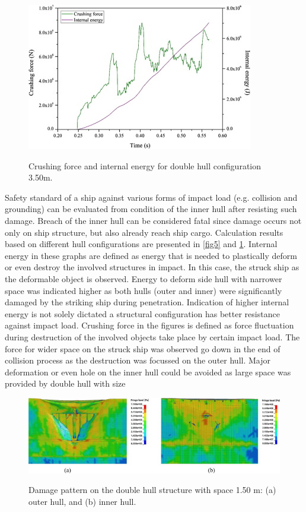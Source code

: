 \documentclass[../Final.tex]{subfiles}
\begin{document}
\begin{figure}[h]
    \centering
    \includegraphics[width=\columnwidth]{fig6.jpg}
    \label{fig6}
    \caption{Crushing force and internal energy for double hull configuration 3.50m.}
\end{figure}

Safety standard of a ship against various forms of impact load (e.g. collision and grounding) can be evaluated from condition of the inner hull after resisting such damage. 
Breach of the inner hull can be considered fatal since damage occurs not only on ship structure, but also already reach ship cargo. Calculation results based on different hull configurations are presented in \ref{fig5} and \ref{fig6}. 
Internal energy in these graphs are defined as energy that is needed to plastically deform or even destroy the involved structures in impact. 
In this case, the struck ship as the deformable object is observed. Energy to deform side hull with narrower space was indicated higher as both hulls (outer and inner) were significantly damaged by the striking ship during penetration. 
Indication of higher internal energy is not solely dictated a structural configuration has better resistance against impact load. 
Crushing force in the figures is defined as force fluctuation during destruction of the involved objects take place by certain impact load. 
The force for wider space on the struck ship was observed go down in the end of collision process as the destruction was focussed on the outer hull. Major deformation or even hole on the inner hull could be 
avoided as large space was provided by double hull with size

\begin{figure}[h]
    \centering
    \includegraphics[width=\columnwidth]{fig7.jpg}
    \label{fig7}
    \caption{Damage pattern on the double hull structure with space 1.50 m: (a) outer hull, and (b) inner hull.}
\end{figure}
\end{document}
